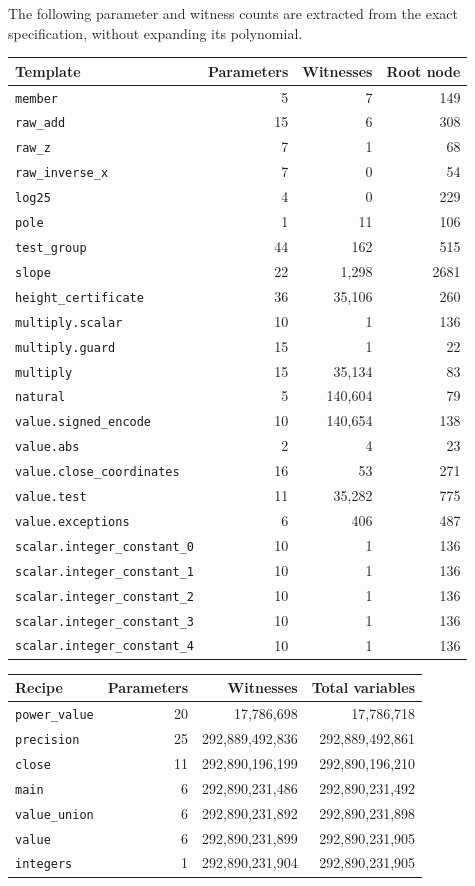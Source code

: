 \documentclass[11pt]{article}
\theoremstyle{definition}
\theoremstyle{remark}
\begin{document}
The following parameter and witness counts are extracted from the exact
specification, without expanding its polynomial.
\begin{longtable}{p{}rrr}
\toprule Template & Parameters & Witnesses & Root node\\\midrule\endhead
\nolinkurl{member} & 5 & 7 & 149\\
\nolinkurl{raw_add} & 15 & 6 & 308\\
\nolinkurl{raw_z} & 7 & 1 & 68\\
\nolinkurl{raw_inverse_x} & 7 & 0 & 54\\
\nolinkurl{log25} & 4 & 0 & 229\\
\nolinkurl{pole} & 1 & 11 & 106\\
\nolinkurl{test_group} & 44 & 162 & 515\\
\nolinkurl{slope} & 22 & 1,298 & 2681\\
\nolinkurl{height_certificate} & 36 & 35,106 & 260\\
\nolinkurl{multiply.scalar} & 10 & 1 & 136\\
\nolinkurl{multiply.guard} & 15 & 1 & 22\\
\nolinkurl{multiply} & 15 & 35,134 & 83\\
\nolinkurl{natural} & 5 & 140,604 & 79\\
\nolinkurl{value.signed_encode} & 10 & 140,654 & 138\\
\nolinkurl{value.abs} & 2 & 4 & 23\\
\nolinkurl{value.close_coordinates} & 16 & 53 & 271\\
\nolinkurl{value.test} & 11 & 35,282 & 775\\
\nolinkurl{value.exceptions} & 6 & 406 & 487\\
\nolinkurl{scalar.integer_constant_0} & 10 & 1 & 136\\
\nolinkurl{scalar.integer_constant_1} & 10 & 1 & 136\\
\nolinkurl{scalar.integer_constant_2} & 10 & 1 & 136\\
\nolinkurl{scalar.integer_constant_3} & 10 & 1 & 136\\
\nolinkurl{scalar.integer_constant_4} & 10 & 1 & 136\\
\bottomrule\end{longtable}

\begin{longtable}{lrrr}
\toprule Recipe & Parameters & Witnesses & Total variables\\\midrule\endhead
\nolinkurl{power_value} & 20 & 17,786,698 & 17,786,718\\
\nolinkurl{precision} & 25 & 292,889,492,836 & 292,889,492,861\\
\nolinkurl{close} & 11 & 292,890,196,199 & 292,890,196,210\\
\nolinkurl{main} & 6 & 292,890,231,486 & 292,890,231,492\\
\nolinkurl{value_union} & 6 & 292,890,231,892 & 292,890,231,898\\
\nolinkurl{value} & 6 & 292,890,231,899 & 292,890,231,905\\
\nolinkurl{integers} & 1 & 292,890,231,904 & 292,890,231,905\\
\bottomrule\end{longtable}
\end{document}
